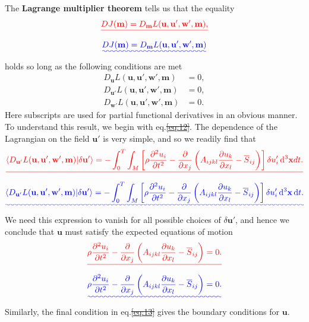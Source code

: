 \documentclass[a4paper,12pt]{paper}
\providecommand{\DIFadd}[1]{{\protect\color{blue}\uwave{#1}}} %
\providecommand{\DIFdel}[1]{{\protect\color{red}\sout{#1}}}                      %
\providecommand{\DIFaddbegin}{} %
\providecommand{\DIFaddend}{} %
\providecommand{\DIFdelbegin}{} %
\providecommand{\DIFdelend}{} %
\begin{document}
The \textbf{Lagrange multiplier theorem} tells us that the equality
\DIFdelbegin \begin{displaymath}
\DIFdel{DJ(\mathbf{m})=D_{\mathbf{m}}L(\mathbf{u},\mathbf{u}',\mathbf{w}',\mathbf{m}),
}\end{displaymath}%
\DIFdelend \DIFaddbegin \begin{equation}
\DIFadd{DJ(\mathbf{m})=D_{\mathbf{m}}L(\mathbf{u},\mathbf{u}',\mathbf{w}',\mathbf{m})
\label{eq:10}
}\end{equation}\DIFaddend 
holds so long as the following conditions are met
\begin{align}
D_{\mathbf{u}}L(\mathbf{u},\mathbf{u}',\mathbf{w}',\mathbf{m})&=0, \label{eq:11} \\
D_{\mathbf{u}'}L(\mathbf{u},\mathbf{u}',\mathbf{w}',\mathbf{m})&=0, \label{eq:12} \\
D_{\mathbf{w}'}L(\mathbf{u},\mathbf{u}',\mathbf{w}',\mathbf{m})&=0.
\label{eq:13}
\end{align}
Here subscripts are used for partial functional derivatives in an obvious manner. To understand this result, 
we begin with eq.\DIFdelbegin \DIFdel{\eqref{eq:12}}\DIFdelend \DIFaddbegin \DIFadd{~(\ref{eq:12})}\DIFaddend . The dependence of the Lagrangian on the field $\mathbf{u}'$ is very simple, 
and so we readily find that
\DIFdelbegin \begin{displaymath}
\DIFdel{\langle D_{\mathbf{u}'}L(\mathbf{u},\mathbf{u}',\mathbf{w}',\mathbf{m})|\delta \mathbf{u}'\rangle = -\int_{0}^{T}\int_{M}\left[\rho\frac{\partial^{2}u_{i}}{\partial t^{2}}-\frac{\partial}{\partial x_{j}}\left(A_{ijkl}
\frac{\partial u_{k}}{\partial x_{l}}-\overline{S}_{ij}\right)\right]\delta u'_{i}\dd^{3}\mathbf{x}dt.
}\end{displaymath}%
\DIFdelend \DIFaddbegin \begin{equation}
\DIFadd{\langle D_{\mathbf{u}'}L(\mathbf{u},\mathbf{u}',\mathbf{w}',\mathbf{m})|\delta \mathbf{u}'\rangle = -\int_{0}^{T}\int_{M}\left[\rho\frac{\partial^{2}u_{i}}{\partial t^{2}}-\frac{\partial}{\partial x_{j}}\left(A_{ijkl}
\frac{\partial u_{k}}{\partial x_{l}}-\overline{S}_{ij}\right)\right]\delta u'_{i}\dd^{3}\mathbf{x}\dd t.
\label{eq:14}
}\end{equation}\DIFaddend 
We need this expression to vanish for all possible choices of $\delta \mathbf{u}'$, and hence we 
conclude that $\mathbf{u}$ must satisfy the expected equations of motion
\DIFdelbegin \begin{displaymath}
\DIFdel{\rho\frac{\partial^{2}u_{i}}{\partial t^{2}}-\frac{\partial}{\partial x_{j}}\left(A_{ijkl}\frac{\partial u_{k}}{\partial x_{l}}-\overline{S}_{ij}\right)=0.
}\end{displaymath}%
\DIFdelend \DIFaddbegin \begin{equation}
\DIFadd{\rho\frac{\partial^{2}u_{i}}{\partial t^{2}}-\frac{\partial}{\partial x_{j}}\left(A_{ijkl}\frac{\partial u_{k}}{\partial x_{l}}-\overline{S}_{ij}\right)=0.
\label{eq:15}
}\end{equation}\DIFaddend 
Similarly, the final condition in eq.\DIFdelbegin \DIFdel{\eqref{eq:13} }\DIFdelend \DIFaddbegin \DIFadd{~(\ref{eq:13}) }\DIFaddend gives the boundary conditions for $\mathbf{u}$. 
\end{document}
